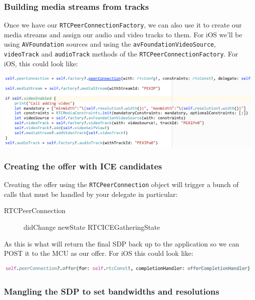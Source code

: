 \documentclass[a4paper,11pt]{article}
\begin{document}
\subsubsection{Building media streams from tracks}
\label{sec:orgc7449c0}

\label{org08f246d}

Once we have our \texttt{RTCPeerConnectionFactory}, we can also use it to
create our media streams and assign our audio and video tracks to
them.  For iOS we'll be using \texttt{AVFoundation} sources and using the
\texttt{avFoundationVideoSource}, \texttt{videoTrack} and \texttt{audioTrack} methods of
the \texttt{RTCPeerConnectionFactory}.  For iOS, this could look like:

\begin{center}
\includegraphics[width=.9\linewidth]{./images/add_tracks.png}
\end{center}

\subsubsection{Creating the offer with ICE candidates}
\label{sec:orgfa99b14}

Creating the offer using the \texttt{RTCPeerConnection} object will trigger a
bunch of calls that must be handled by your delegate in particular:

\begin{description}
\item[{RTCPeerConnection}] didChange newState RTCICEGatheringState
\end{description}

As this is what will return the final SDP back up to the application
so we can POST it to the MCU as our offer.  For iOS this could look like:

\begin{center}
\includegraphics[width=.9\linewidth]{./images/peer_conn_offer.png}
\end{center}

\subsubsection{Mangling the SDP to set bandwidths and resolutions}
\label{sec:org5cbf104}
\end{document}
